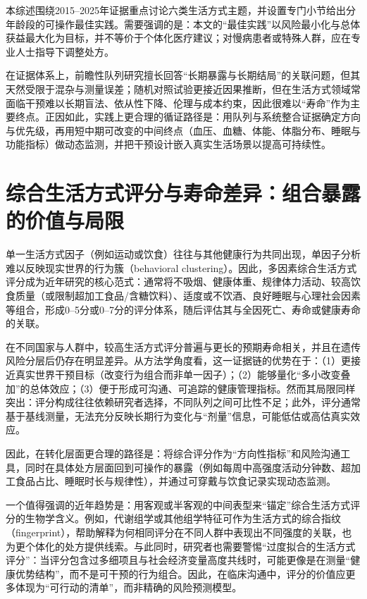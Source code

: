 \documentclass[11pt,a4paper]{article}
\begin{document}
本综述围绕2015--2025年证据重点讨论六类生活方式主题，并设置专门小节给出分年龄段的可操作最佳实践。需要强调的是：本文的“最佳实践”以风险最小化与总体获益最大化为目标，并不等价于个体化医疗建议；对慢病患者或特殊人群，应在专业人士指导下调整处方。

在证据体系上，前瞻性队列研究擅长回答“长期暴露与长期结局”的关联问题，但其天然受限于混杂与测量误差；随机对照试验更接近因果推断，但在生活方式领域常面临干预难以长期盲法、依从性下降、伦理与成本约束，因此很难以“寿命”作为主要终点。正因如此，实践上更合理的循证路径是：用队列与系统整合证据确定方向与优先级，再用短中期可改变的中间终点（血压、血糖、体能、体脂分布、睡眠与功能指标）做动态监测，并把干预设计嵌入真实生活场景以提高可持续性。

\section{综合生活方式评分与寿命差异：组合暴露的价值与局限}

单一生活方式因子（例如运动或饮食）往往与其他健康行为共同出现，单因子分析难以反映现实世界的行为簇（behavioral clustering）。因此，多因素综合生活方式评分成为近年研究的核心范式：通常将不吸烟、健康体重、规律体力活动、较高饮食质量（或限制超加工食品/含糖饮料）、适度或不饮酒、良好睡眠与心理社会因素等组合，形成0--5分或0--7分的评分体系，随后评估其与全因死亡、寿命或健康寿命的关联\cite{healthylifestyleand2023,associationofhealthy2021,environmentallifestylefactors2017,lifestylefactorsand2020}。

在不同国家与人群中，较高生活方式评分普遍与更长的预期寿命相关，并且在遗传风险分层后仍存在明显差异\cite{healthylifestyleand2023,plasmametabolitesof2023}。从方法学角度看，这一证据链的优势在于：（1）更接近真实世界干预目标（改变行为组合而非单一因子）；（2）能够量化“多小改变叠加”的总体效应；（3）便于形成可沟通、可追踪的健康管理指标。然而其局限同样突出：评分构成往往依赖研究者选择，不同队列之间可比性不足；此外，评分通常基于基线测量，无法充分反映长期行为变化与“剂量”信息，可能低估或高估真实效应。

因此，在转化层面更合理的路径是：将综合评分作为“方向性指标”和风险沟通工具，同时在具体处方层面回到可操作的暴露（例如每周中高强度活动分钟数、超加工食品占比、睡眠时长与规律性），并通过可穿戴与饮食记录实现动态监测。

一个值得强调的近年趋势是：用客观或半客观的中间表型来“锚定”综合生活方式评分的生物学含义。例如，代谢组学或其他组学特征可作为生活方式的综合指纹（fingerprint），帮助解释为何相同评分在不同人群中表现出不同强度的关联，也为更个体化的处方提供线索\cite{plasmametabolitesof2023}。与此同时，研究者也需要警惕“过度拟合的生活方式评分”：当评分包含过多细项且与社会经济变量高度共线时，可能更像是在测量“健康优势结构”，而不是可干预的行为组合。因此，在临床沟通中，评分的价值应更多体现为“可行动的清单”，而非精确的风险预测模型。
\end{document}
